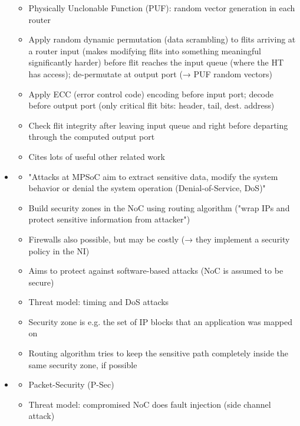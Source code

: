 \begin{itemize}
\begin{itemize}
            \item Physically Unclonable Function (PUF): random vector generation in each router
            \item Apply random dynamic permutation (data scrambling) to flits arriving at a router input (makes modifying flits into something
                meaningful significantly harder) before flit reaches the input queue (where the HT has access); de-permutate at output port (→
                PUF random vectors)
            \item Apply ECC (error control code) encoding before input port; decode before output port (only critical flit bits: header, tail,
                dest. address)
            \item Check flit integrity after leaving input queue and right before departing through the computed output port
            \item Cites lots of useful other related work
        \end{itemize}
    \item \textbf{} \checkmark
        \begin{itemize}
            \item "Attacks at MPSoC aim to extract sensitive data, modify the system behavior or denial the system operation (Denial-of-Service,
                DoS)"
            \item Build security zones in the NoC using routing algorithm ("wrap IPs and protect sensitive information from attacker")
            \item Firewalls also possible, but may be costly (→ they implement a security policy in the NI)
            \item Aims to protect against software-based attacks (NoC is assumed to be secure)
            \item Threat model: timing and DoS attacks
            \item Security zone is e.g. the set of IP blocks that an application was mapped on
            \item Routing algorithm tries to keep the sensitive path completely inside the same security zone, if possible
        \end{itemize}
    \item \textbf{} \checkmark
        \begin{itemize}
            \item Packet-Security (P-Sec)
            \item Threat model: compromised NoC does fault injection (side channel attack)

\end{itemize}
\end{itemize}
